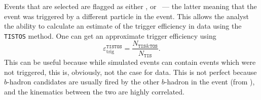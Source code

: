 Events that are selected are flagged as either
\tos, or
\tis~--- the latter meaning that the event was triggered by
a different particle in the event.
This allows the analyst the ability to calculate an estimate of the trigger efficiency in data
using the {\tt TISTOS} method.
One can get an approximate trigger efficiency using
\begin{equation}
  \varepsilon_\mathrm{trig}^\mathtt{TISTOS} =
  \frac {N_\mathtt{TIS\&TOS}} {N_\mathtt{TIS}}.
\end{equation}
This can be useful because while simulated events can contain events which were not triggered, this
is, obviously, not the case for data.
This is not perfect because \tis $b$-hadron candidates are usually fired by the other $b$-hadron
in the event (from ), and the kinematics between the two are highly correlated.



